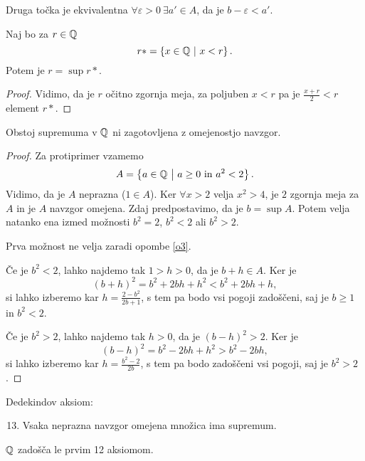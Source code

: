 \documentclass[12pt, a4paper]{article}
\begin{document}
\begin{opomba}
Druga točka je ekvivalentna $\forall\varepsilon>0~\exists a'\in A$, da je $b-\varepsilon < a'$.
\end{opomba}

\begin{opomba}
Naj bo za $r\in\mathbb{Q}$
\[
r*=\left\{x\in\mathbb{Q}~\middle\vert~x<r\right\}.
\]
Potem je $r=\sup r*$.
\end{opomba}

\begin{proof}
Vidimo, da je $r$ očitno zgornja meja, za poljuben $x<r$ pa je $\frac{x+r}{2}<r$ element $r*$.
\end{proof}

\begin{opomba}
Obstoj supremuma v $\mathbb{Q}$ ni zagotovljena z omejenostjo navzgor.
\end{opomba}

\begin{proof}
Za protiprimer vzamemo
\[
A=\left\{a\in\mathbb{Q}~\middle\vert~\text{$a\geq 0$ in $a^2<2$}\right\}.
\]
Vidimo, da je $A$ neprazna ($1\in A$). Ker $\forall x>2$ velja  $x^2>4$, je $2$ zgornja meja za $A$ in je $A$ navzgor omejena. Zdaj predpostavimo, da je $b=\sup A$. Potem velja natanko ena izmed možnosti $b^2=2$, $b^2<2$ ali $b^2>2$.

Prva možnost ne velja zaradi opombe \ref{o3}.

Če je $b^2<2$, lahko najdemo tak $1>h>0$, da je $b+h\in A$. Ker je
\[(b+h)^2=b^2+2bh+h^2<b^2+2bh+h,\]
si lahko izberemo kar $h=\frac{2-b^2}{2b+1}$, s tem pa bodo vsi pogoji zadoščeni, saj je $b\geq 1$ in $b^2<2$.

Če je $b^2>2$, lahko najdemo tak $h>0$, da je $(b-h)^2>2$. Ker je
\[(b-h)^2=b^2-2bh+h^2>b^2-2bh,\]
si lahko izberemo kar $h=\frac{b^2-2}{2b}$, s tem pa bodo zadoščeni vsi pogoji, saj je $b^2>2$.
\end{proof}

\begin{okvir}
\begin{definicija}
Dedekindov aksiom:

\begin{enumerate}[label=A\arabic*:]
\setcounter{enumi}{12}
\item Vsaka neprazna navzgor omejena množica ima supremum.
\end{enumerate}
\end{definicija}
\end{okvir}

\begin{opomba}
$\mathbb{Q}$ zadošča le prvim 12 aksiomom.
\end{opomba}
\end{document}
